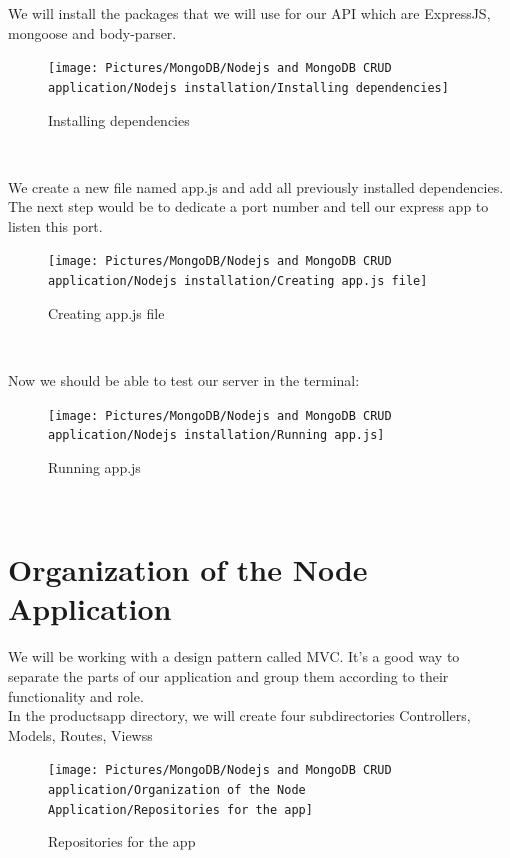 \begin{spacing}{1.2}
\par We will install the packages that we will use for our API which are ExpressJS, mongoose and body-parser.
\\
\begin{figure}[!htb] 
\begin{center} 
\texttt{[image: Pictures/MongoDB/Nodejs and MongoDB CRUD  application/Nodejs installation/Installing dependencies]} 
\end{center} 
\caption{Installing dependencies} 
\end{figure}  \FloatBarrier
\\
\newpage
\par We create a new file named app.js and add all previously installed dependencies.
The next step would be to dedicate a port number and tell our express app to listen
this port.
\\
\begin{figure}[!htb] 
\begin{center} 
\texttt{[image: Pictures/MongoDB/Nodejs and MongoDB CRUD  application/Nodejs installation/Creating app.js file]} 
\end{center} 
\caption{Creating app.js file} 
\end{figure}  \FloatBarrier
\\

\par Now we should be able to test our server
in the terminal:
\\
\begin{figure}[!htb] 
\begin{center} 
\texttt{[image: Pictures/MongoDB/Nodejs and MongoDB CRUD  application/Nodejs installation/Running app.js]} 
\end{center} 
\caption{Running app.js} 
\end{figure}  \FloatBarrier
\\

\newpage
\section{Organization of the Node Application }
\par We will be working with a design pattern called MVC. It's a good way to separate the
parts of our application and group them according to their functionality and role.\\
In the productsapp directory, we will create four subdirectories Controllers, Models, Routes, Viewss
\\
\begin{figure}[!htb] 
\begin{center} 
\texttt{[image: Pictures/MongoDB/Nodejs and MongoDB CRUD  application/Organization of the Node Application/Repositories for the app]} 
\end{center} 
\caption{Repositories for the app} 
\end{figure}  \FloatBarrier
\\


\end{spacing}
